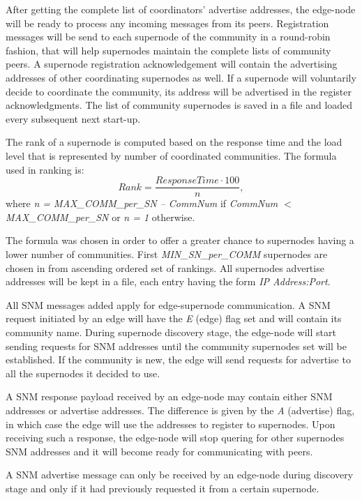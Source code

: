 After getting the complete list of coordinators' advertise addresses, the edge-node will be ready to process any incoming messages from its peers. Registration messages will be send to each supernode of the community in a round-robin fashion, that will help supernodes maintain the complete lists of community peers. A supernode registration acknowledgement will contain the advertising addresses of other coordinating supernodes as well. If a supernode will voluntarily decide to coordinate the community, its address will be advertised in the register acknowledgments. The list of community supernodes is saved in a file and loaded every subsequent next start-up.

The rank of a supernode is computed based on the response time and the load level that is represented by  number of coordinated communities. The formula used in ranking is:
\[
Rank = \frac{ResponseTime \cdot 100}{n},
\]
where \emph{n = MAX_COMM_per_SN – CommNum} if \emph{CommNum $<$ MAX_COMM_per_SN} or \emph{n = 1} otherwise.

The formula was chosen in order to offer a greater chance to supernodes having a lower number of communities. First \emph{MIN_SN_per_COMM} supernodes are chosen in from ascending ordered set of rankings. All supernodes advertise addresses will be kept in a file, each entry having the form \emph{IP Address:Port}.

All SNM messages added apply for edge-supernode communication. A SNM request initiated by an edge will have the \emph{E} (edge) flag set and will contain its community name. During supernode discovery stage, the edge-node will start sending requests for SNM addresses until the community supernodes set will be established. If the community is new, the edge will send requests for advertise to all the supernodes it decided to use.

A SNM response payload received by an edge-node may contain either SNM addresses or advertise addresses. The difference is given by the \emph{A} (advertise) flag, in which case the edge will use the addresses to register to supernodes. Upon receiving  such a response, the edge-node will stop quering for other supernodes SNM addresses and it will become ready for communicating with peers.

A SNM advertise message can only be received by an edge-node during discovery stage and only if it had previously requested it from a certain supernode.